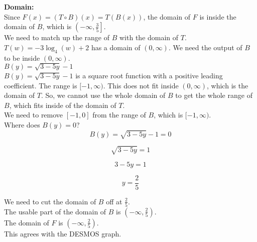 \documentclass{ximera}
\begin{document}
\textbf{\textcolor{blue!55!black}{Domain:}} \\



Since $F(x) = (T \circ B)(x) = T(B(x))$, the domain of $F$ is inside the domain of $B$, which is $\left(-\infty, \frac{3}{5} \right]$. \\

We need to match up the range of $B$ with the domain of $T$. \\


$T(w) = -3 \log_4(w) + 2$ has a domain of $(0, \infty)$.  We need the output of $B$ to be inside $(0, \infty)$. \\



$B(y) = \sqrt{3 - 5y} - 1$ \\



$B(y) = \sqrt{3 - 5y} - 1$ is a square root function with a positive leading coefficient.  The range is $[-1, \infty)$.   This does not fit inside $(0, \infty)$, which is the domain of $T$.  So, we cannot use the whole domain of $B$ to get the whole range of $B$, which fits inside of the domain of $T$. \\


We need to remove $[-1, 0]$ from the range of $B$, which is $[-1, \infty)$. \\


Where does $B(y) = 0$? \\


\[
B(y) = \sqrt{3 - 5y} - 1 = 0
\]


\[
\sqrt{3 - 5y} = 1
\]


\[
3 - 5y = 1
\]

\[
y = \frac{2}{5}
\]

We need to cut the domain of $B$ off at $\frac{2}{5}$. \\


The usable part of the domain of $B$ is  $\left(-\infty, \frac{2}{5} \right)$. \\


The domain of $F$ is $\left(-\infty, \frac{2}{5} \right)$. \\


This agrees with the DESMOS graph. \\
\end{document}
